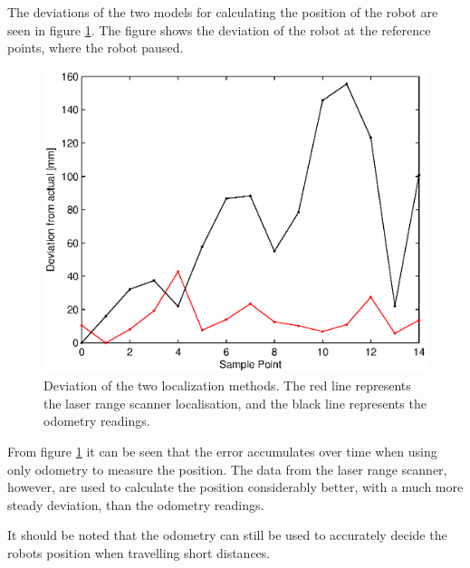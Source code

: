 The deviations of the two models for calculating the position of the robot are seen in figure \ref{fig:deviationOfEncoderVSScanner}.
The figure shows the deviation of the robot at the reference points, where the robot paused.

\begin{figure}[H]
\centering
\includegraphics[width = 13cm]{graphics/deviation_encoderVSscanner}
\caption[Deviation of the two localization methods.]{Deviation of the two localization methods. The red line represents the laser range scanner localisation, and the black line represents the odometry readings.}
\label{fig:deviationOfEncoderVSScanner}
\end{figure}

From figure \ref{fig:deviationOfEncoderVSScanner} it can be seen that the error accumulates over time
when using only odometry to measure the position.
The data from the laser range scanner, however, are used to calculate the position considerably better,
with a much more steady deviation, than the odometry readings.

It should be noted that the odometry can still be used to accurately decide the robots position
when travelling short distances.
